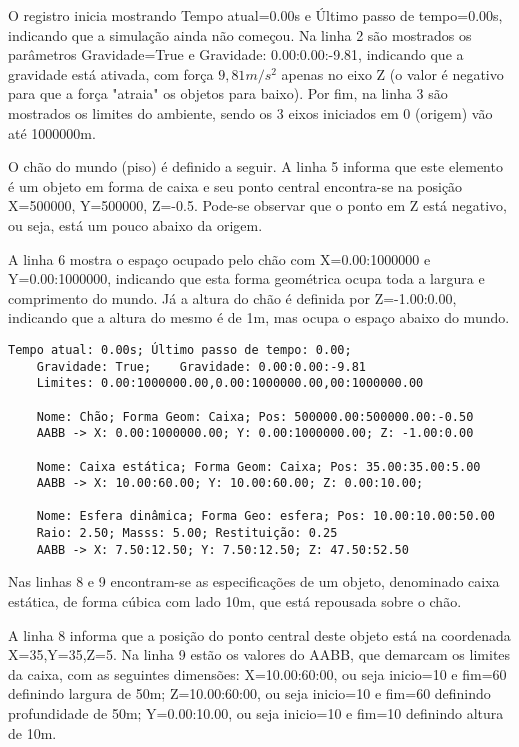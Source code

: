 \documentclass[12pt]{article}
\begin{document}
O registro inicia mostrando Tempo atual=0.00s e Último passo de tempo=0.00s, indicando que a simulação ainda não começou. Na linha 2 são mostrados os parâmetros Gravidade=True e Gravidade: 0.00:0.00:-9.81, indicando que a gravidade está ativada, com força $9,81 m/s^{2}$ apenas no eixo Z (o valor é negativo para que a força "atraia" os objetos para baixo). Por fim, na linha 3 são mostrados os limites do ambiente, sendo os 3 eixos iniciados em 0 (origem) vão até 1000000m.

O chão do mundo (piso) é definido a seguir. A linha 5 informa que este elemento é um objeto em forma de caixa e seu ponto central encontra-se na posição X=500000, Y=500000, Z=-0.5. Pode-se observar que o ponto em Z está negativo, ou seja, está um pouco abaixo da origem. 

A linha 6 mostra o espaço ocupado pelo chão com X=0.00:1000000 e Y=0.00:1000000, indicando que esta forma geométrica ocupa toda a largura e comprimento do mundo. Já a altura do chão é  definida por Z=-1.00:0.00, indicando que a altura do mesmo é de 1m, mas ocupa o espaço abaixo do mundo.

\begin{lstlisting}[frame=single,caption=Registro Acessível: Inicialização do ambiente\label{lg:init_world}]
	Tempo atual: 0.00s; Último passo de tempo: 0.00; 
	Gravidade: True; 	Gravidade: 0.00:0.00:-9.81
	Limites: 0.00:1000000.00,0.00:1000000.00,00:1000000.00

	Nome: Chão; Forma Geom: Caixa; Pos: 500000.00:500000.00:-0.50
	AABB -> X: 0.00:1000000.00; Y: 0.00:1000000.00; Z: -1.00:0.00
		
	Nome: Caixa estática; Forma Geom: Caixa; Pos: 35.00:35.00:5.00
	AABB -> X: 10.00:60.00; Y: 10.00:60.00; Z: 0.00:10.00; 
	
	Nome: Esfera dinâmica; Forma Geo: esfera; Pos: 10.00:10.00:50.00
	Raio: 2.50; Masss: 5.00; Restituição: 0.25
	AABB -> X: 7.50:12.50; Y: 7.50:12.50; Z: 47.50:52.50
\end{lstlisting}

Nas linhas 8 e 9 encontram-se as especificações de um objeto, denominado caixa estática, de forma cúbica com lado 10m, que está repousada sobre o chão.

A linha 8 informa que a posição do ponto central deste objeto está na coordenada X=35,Y=35,Z=5. Na linha 9 estão os valores do AABB, que demarcam os limites da caixa, com as seguintes dimensões: X=10.00:60:00, ou seja inicio=10 e fim=60 definindo largura de 50m; Z=10.00:60:00, ou seja inicio=10 e fim=60 definindo profundidade de 50m; Y=0.00:10.00, ou seja inicio=10 e fim=10 definindo altura de 10m.
\end{document}
